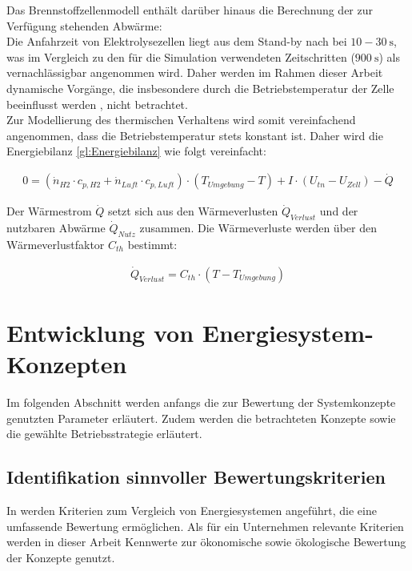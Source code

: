 Das Brennstoffzellenmodell enthält darüber hinaus die Berechnung der zur Verfügung stehenden Abwärme:\\
Die Anfahrzeit von Elektrolysezellen liegt aus dem Stand-by nach \citet{milanzi_technischer_2018} bei $10-\SI{30}{\s}$, was im Vergleich zu den für die Simulation verwendeten Zeitschritten ($\SI{900}{\s}$) als vernachlässigbar angenommen wird. Daher werden im Rahmen dieser Arbeit dynamische Vorgänge, die insbesondere durch die  Betriebstemperatur der Zelle beeinflusst werden \citep{garcia-valverde_simple_2012}, nicht betrachtet.\\
Zur Modellierung des thermischen Verhaltens wird somit vereinfachend angenommen, dass die Betriebstemperatur stets konstant ist. Daher wird die Energiebilanz \ref{gl:Energiebilanz} wie folgt vereinfacht:

\begin{align}
0 = (\dot{n}_{H2} \cdot c_{p, H2} + \dot{n}_{Luft} \cdot c_{p, Luft}) \cdot (T_{Umgebung} - T) + I \cdot (U_{tn} - U_{Zell}) - \dot{Q}
\end{align}

Der Wärmestrom $\dot{Q}$ setzt sich aus den Wärmeverlusten $\dot{Q}_{Verlust}$ und der nutzbaren Abwärme $\dot{Q}_{Nutz}$ zusammen. Die Wärmeverluste werden über den Wärmeverlustfaktor $C_{th}$ bestimmt:

\begin{align}
\dot{Q}_{Verlust} = C_{th} \cdot (T - T_{Umgebung}) 
\end{align}

\section{Entwicklung von Energiesystem-Konzepten}
Im folgenden Abschnitt werden anfangs die zur Bewertung der Systemkonzepte genutzten Parameter erläutert. Zudem werden die betrachteten Konzepte sowie die gewählte Betriebsstrategie erläutert.

\subsection{Identifikation sinnvoller Bewertungskriterien}
In \citet{reich_grundlagen_2018} werden Kriterien zum Vergleich von Energiesystemen angeführt, die eine umfassende Bewertung ermöglichen. Als für ein Unternehmen relevante Kriterien werden in dieser Arbeit Kennwerte zur ökonomische sowie ökologische Bewertung der Konzepte genutzt.\\

